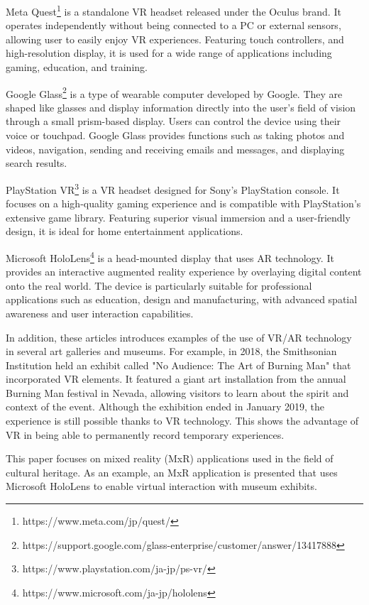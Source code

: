 \documentclass[12pt]{article}
\begin{document}
Meta Quest\footnote{https://www.meta.com/jp/quest/} is a standalone VR headset
released under the Oculus brand. It
operates independently without being connected to a PC or external sensors,
allowing user to easily enjoy VR experiences. Featuring touch controllers, and
high-resolution display, it is used
for a wide range of applications including gaming, education, and training.

Google
Glass\footnote{https://support.google.com/glass-enterprise/customer/answer/13417888}
is a type of wearable computer developed by Google. They are
shaped like glasses and display information directly into the user's field of
vision through a small prism-based display. Users can control the device using
their voice or touchpad. Google Glass provides functions such as taking photos
and videos, navigation, sending and receiving emails and messages, and
displaying search results.

PlayStation VR\footnote{https://www.playstation.com/ja-jp/ps-vr/} is a VR
headset designed for Sony's PlayStation console. It
focuses on a high-quality gaming experience and is compatible with
PlayStation's extensive game library. Featuring superior visual immersion and a
user-friendly design, it is ideal for home entertainment applications.

Microsoft HoloLens\footnote{https://www.microsoft.com/ja-jp/hololens} is a
head-mounted display that uses AR technology. It
provides an interactive augmented reality experience by overlaying digital
content onto the real world. The device is particularly suitable for
professional applications such as education, design and manufacturing, with
advanced spatial awareness and user interaction capabilities.

In addition, these articles\cite{vr_museum, vr_museum_ieee} introduces examples
of the use of VR/AR technology in several art galleries and museums. For
example, in 2018,
the Smithsonian Institution held an exhibit called "No Audience: The Art of
Burning Man" that incorporated VR elements. It featured a giant art
installation from the annual Burning Man festival in Nevada, allowing visitors
to learn about the spirit and context of the event. Although the exhibition
ended in January 2019, the experience is still possible thanks to VR
technology. This shows the advantage of VR in being able to permanently record
temporary experiences.

This paper \cite{10.3389/frobt.2019.00091} focuses on mixed reality (MxR)
applications used in the
field of cultural
heritage. As an example, an MxR application is presented that uses Microsoft
HoloLens to enable virtual interaction with museum exhibits.
\end{document}
